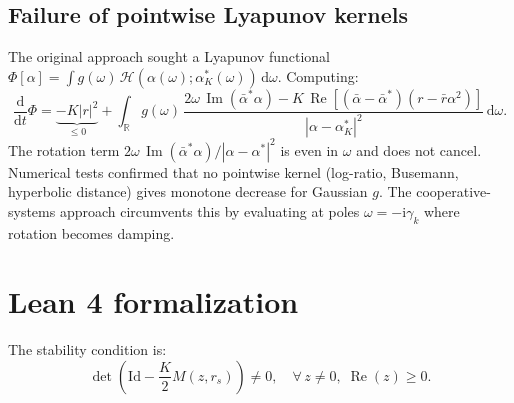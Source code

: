 \documentclass[11pt,a4paper]{article}
\theoremstyle{definition}
\DeclareMathOperator{\re}{Re}
\DeclareMathOperator{\im}{Im}
\newcommand{\R}{\mathbb{R}}
\begin{document}
\subsection{Failure of pointwise Lyapunov kernels}\label{sec:pointwise-failure}

The original approach sought a Lyapunov functional $\Phi[\alpha] = \int g(\omega)\,\mathcal{H}(\alpha(\omega); \alpha^*_K(\omega))\,\mathrm{d}\omega$. Computing:
\[
\frac{\mathrm{d}}{\mathrm{d}t}\Phi = \underbrace{-K|r|^2}_{\leq 0} + \int_\R g(\omega)\,\frac{2\omega\,\im(\bar{\alpha}^*\alpha) - K\,\re[(\bar{\alpha}-\bar{\alpha}^*)(r-\bar{r}\alpha^2)]}{|\alpha - \alpha^*_K|^2}\,\mathrm{d}\omega.
\]
The rotation term $2\omega\,\im(\bar{\alpha}^*\alpha)/|\alpha-\alpha^*|^2$ is even in $\omega$ and does not cancel. Numerical tests confirmed that no pointwise kernel (log-ratio, Busemann, hyperbolic distance) gives monotone decrease for Gaussian $g$. The cooperative-systems approach circumvents this by evaluating at poles $\omega = -\mathrm{i}\gamma_k$ where rotation becomes damping.

\section{Lean 4 formalization}

The stability condition is:
\begin{equation}\label{eq:stability-condition}
\det\!\left(\mathrm{Id} - \frac{K}{2}M(z, r_s)\right) \neq 0, \quad \forall\,z \neq 0,\;\re(z) \geq 0.
\end{equation}
\end{document}
